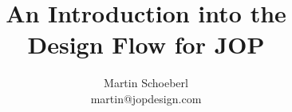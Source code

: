 \documentclass[a4paper,12pt]{scrartcl}
\begin{document}
\title{An Introduction into the \\Design Flow for JOP}
\author{Martin Schoeberl\\martin@jopdesign.com}
\maketitle \thispagestyle{empty}





\end{document}
